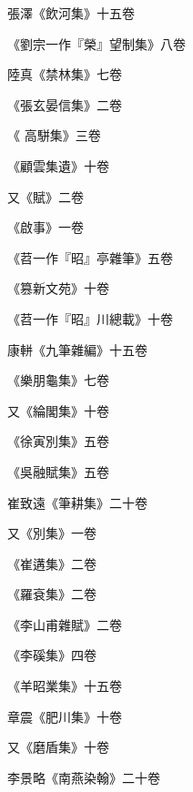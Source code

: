 \begin{pinyinscope}
 張澤《飲河集》十五卷



 《劉宗一作『榮』望制集》八卷



 陸真《禁林集》七卷



 《張玄晏信集》二卷



 《
 高駢集》三卷



 《顧雲集遺》十卷



 又《賦》二卷



 《啟事》一卷



 《苕一作『昭』亭雜筆》五卷



 《篡新文苑》十卷



 《苕一作『昭』川總載》十卷



 康軿《九筆雜編》十五卷



 《樂朋龜集》七卷



 又《綸閣集》十卷



 《徐寅別集》五卷



 《吳融賦集》五卷



 崔致遠《筆耕集》二十卷



 又《別集》一卷



 《崔遘集》二卷



 《羅袞集》二卷



 《李山甫雜賦》二卷



 《李磎集》四卷



 《羊昭業集》十五卷



 章震《肥川集》十卷



 又《磨盾集》十卷



 李景略《南燕染翰》二十卷




\end{pinyinscope}

